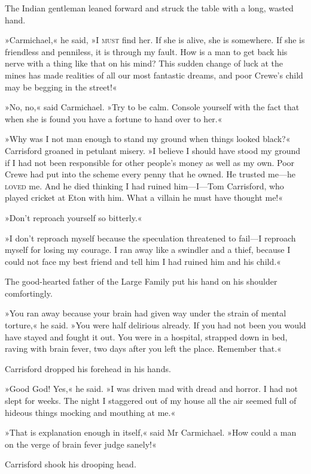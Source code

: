 The Indian gentleman leaned forward and struck the table with a long, wasted hand.

»Carmichael,« he said, »I \textsc{must} find her. If she is alive, she is somewhere. If she is friendless and penniless, it is through my fault. How is a man to get back his nerve with a thing like that on his mind? This sudden change of luck at the mines has made realities of all our most fantastic dreams, and poor Crewe's child may be begging in the street!«

»No, no,« said Carmichael. »Try to be calm. Console yourself with the fact that when she is found you have a fortune to hand over to her.«

»Why was I not man enough to stand my ground when things looked black?« Carrisford groaned in petulant misery. »I believe I should have stood my ground if I had not been responsible for other people's money as well as my own. Poor Crewe had put into the scheme every penny that he owned. He trusted me—he \textsc{loved} me. And he died thinking I had ruined him—I—Tom Carrisford, who played cricket at Eton with him. What a villain he must have thought me!«

»Don't reproach yourself so bitterly.«

»I don't reproach myself because the speculation threatened to fail—I reproach myself for losing my courage. I ran away like a swindler and a thief, because I could not face my best friend and tell him I had ruined him and his child.«

The good-hearted father of the Large Family put his hand on his shoulder comfortingly.

»You ran away because your brain had given way under the strain of mental torture,« he said. »You were half delirious already. If you had not been you would have stayed and fought it out. You were in a hospital, strapped down in bed, raving with brain fever, two days after you left the place. Remember that.«

Carrisford dropped his forehead in his hands.

»Good God! Yes,« he said. »I was driven mad with dread and horror. I had not slept for weeks. The night I staggered out of my house all the air seemed full of hideous things mocking and mouthing at me.«

»That is explanation enough in itself,« said Mr Carmichael. »How could a man on the verge of brain fever judge sanely!«

Carrisford shook his drooping head.

